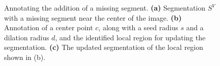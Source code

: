 \documentclass[]{spie}  %
\begin{document}
\begin{figure}[htbp]
\centering
{}
\hspace{0.1em}
\hspace{0.1em}
\caption{Annotating the addition of a missing segment.  \textbf{(a)}
  Segmentation $S^V$ with a missing segment near the center of the
  image.  \textbf{(b)} Annotation of a center point $c$, along with a
  seed radius $s$ and a dilation radius $d$, and the identified local
  region for updating the segmentation.  \textbf{(c)} The updated
  segmentation of the local region shown in (b).} 
\label{fig:addition-ex}
\end{figure}
\end{document}
